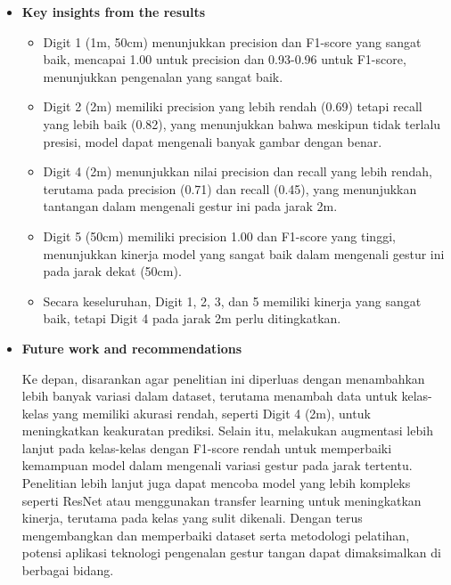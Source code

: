 \documentclass[12pt,a4paper]{article}
\begin{document}
\begin{itemize}
\begin{itemize}
\end{itemize}

\item \textbf{Key insights from the results}
\begin{itemize}
        \item Digit 1 (1m, 50cm) menunjukkan precision dan F1-score yang sangat baik, mencapai 1.00 untuk precision dan 0.93-0.96 untuk F1-score, menunjukkan pengenalan yang sangat baik.

        \item Digit 2 (2m) memiliki precision yang lebih rendah (0.69) tetapi recall yang lebih baik (0.82), yang menunjukkan bahwa meskipun tidak terlalu presisi, model dapat mengenali banyak gambar dengan benar.

        \item Digit 4 (2m) menunjukkan nilai precision dan recall yang lebih rendah, terutama pada precision (0.71) dan recall (0.45), yang menunjukkan tantangan dalam mengenali gestur ini pada jarak 2m.

        \item Digit 5 (50cm) memiliki precision 1.00 dan F1-score yang tinggi, menunjukkan kinerja model yang sangat baik dalam mengenali gestur ini pada jarak dekat (50cm).

        \item Secara keseluruhan, Digit 1, 2, 3, dan 5 memiliki kinerja yang sangat baik, tetapi Digit 4 pada jarak 2m perlu ditingkatkan.
\end{itemize}

\item \textbf{Future work and recommendations}
\begin{itemize}

    \hspace{0.5cm} Ke depan, disarankan agar penelitian ini diperluas dengan menambahkan lebih banyak variasi dalam dataset, terutama menambah data untuk kelas-kelas yang memiliki akurasi rendah, seperti Digit 4 (2m), untuk meningkatkan keakuratan prediksi. Selain itu, melakukan augmentasi lebih lanjut pada kelas-kelas dengan F1-score rendah untuk memperbaiki kemampuan model dalam mengenali variasi gestur pada jarak tertentu. Penelitian lebih lanjut juga dapat mencoba model yang lebih kompleks seperti ResNet atau menggunakan transfer learning untuk meningkatkan kinerja, terutama pada kelas yang sulit dikenali. Dengan terus mengembangkan dan memperbaiki dataset serta metodologi pelatihan, potensi aplikasi teknologi pengenalan gestur tangan dapat dimaksimalkan di berbagai bidang.


\end{itemize}
\end{itemize}
\end{document}
